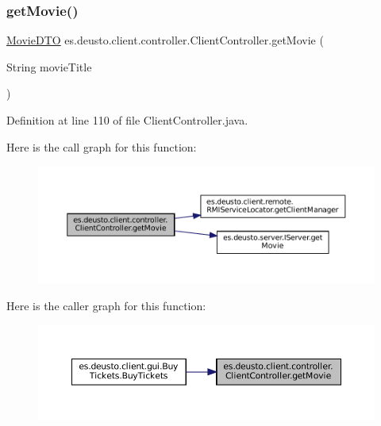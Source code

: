 \mbox{\label{classes_1_1deusto_1_1client_1_1controller_1_1_client_controller_ae371135958d6f88011239d360d936ada}} 
\subsubsection{\texorpdfstring{getMovie()}{getMovie()}}
{\footnotesize\ttfamily \mbox{\hyperlink{classes_1_1deusto_1_1server_1_1data_1_1_movie_d_t_o}{Movie\+D\+TO}} es.\+deusto.\+client.\+controller.\+Client\+Controller.\+get\+Movie (\begin{DoxyParamCaption}\item[{String}]{movie\+Title }\end{DoxyParamCaption})}



Definition at line 110 of file Client\+Controller.\+java.

Here is the call graph for this function\+:
\nopagebreak
\begin{figure}[H]
\begin{center}
\leavevmode
\includegraphics[width=350pt]{classes_1_1deusto_1_1client_1_1controller_1_1_client_controller_ae371135958d6f88011239d360d936ada_cgraph}
\end{center}
\end{figure}
Here is the caller graph for this function\+:
\nopagebreak
\begin{figure}[H]
\begin{center}
\leavevmode
\includegraphics[width=350pt]{classes_1_1deusto_1_1client_1_1controller_1_1_client_controller_ae371135958d6f88011239d360d936ada_icgraph}
\end{center}
\end{figure}
\mbox{\label{classes_1_1deusto_1_1client_1_1controller_1_1_client_controller_a06a84e0834fb21c31f4988e26ee6dedf}} 
